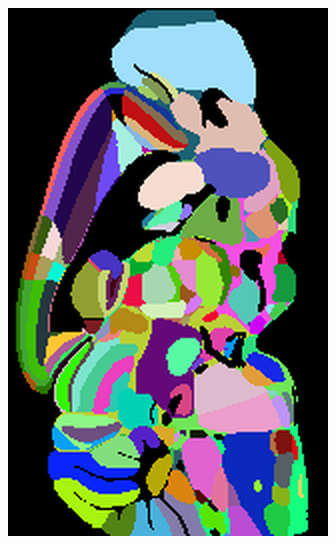 \documentclass[]{article}
\begin{document}
\begin{figure}
\begin{subfigure}{0.3\textwidth}
		\caption{}
	\end{subfigure}
	\begin{subfigure}{0.3\textwidth}
		\centering
		\includegraphics[width=.67\linewidth, angle=270]{../results/random_ano_sagittal_50_res_slice_1.png}
		\caption{}
	\end{subfigure}\\


\end{figure}
\end{document}
